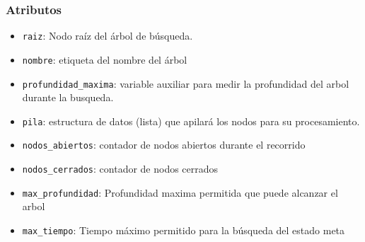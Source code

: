 \documentclass[conference]{IEEEtran}
\begin{document}
    \subsubsection{Atributos}\label{AA_1}
        \begin{itemize}
        \item \texttt{raiz}: Nodo raíz del árbol de búsqueda.
        \item \texttt{nombre}: etiqueta del nombre del árbol
        \item \texttt{profundidad\_maxima}: variable auxiliar para medir la profundidad del arbol durante la busqueda.
        \item \texttt{pila}: estructura de datos (lista) que apilará los nodos para su procesamiento.
        \item \texttt{nodos\_abiertos}: contador de nodos abiertos durante el recorrido
        \item \texttt{nodos\_cerrados}: contador de nodos cerrados 
        \item \texttt{max\_profundidad}: Profundidad maxima permitida que puede alcanzar el arbol 
        \item \texttt{max\_tiempo}: Tiempo máximo permitido para la búsqueda del estado meta
        \end{itemize}
\end{document}
